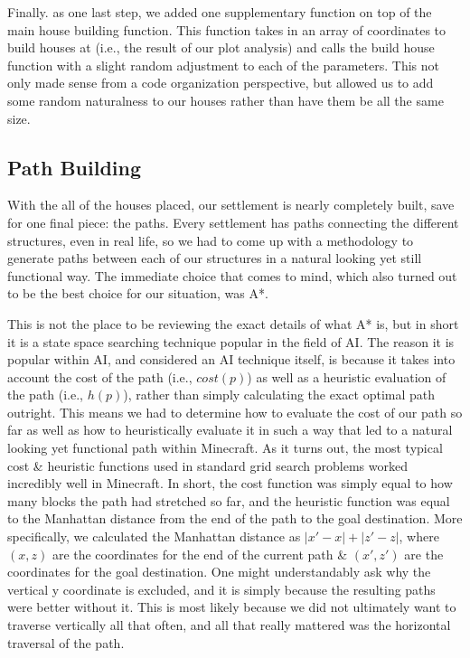 \documentclass[11pt, oneside]{article}
\begin{document}
\begin{normalsize}
Finally. as one last step, we added one supplementary function on top of the main house building function. 
This function takes in an array of coordinates to build houses at (i.e., the result of our plot analysis) and calls the build house function with a slight random adjustment to each of the parameters. 
This not only made sense from a code organization perspective, but allowed us to add some random naturalness to our houses rather than have them be all the same size. 

\subsection{Path Building}

With the all of the houses placed, our settlement is nearly completely built, save for one final piece: the paths. 
Every settlement has paths connecting the different structures, even in real life, so we had to come up with a methodology to generate paths between each of our structures in a natural looking yet still functional way. 
The immediate choice that comes to mind, which also turned out to be the best choice for our situation, was A*.  

This is not the place to be reviewing the exact details of what A* is, but in short it is a state space searching technique popular in the field of AI. 
The reason it is popular within AI, and considered an AI technique itself, is because it takes into account the cost of the path (i.e., $cost(p)$) as well as a heuristic evaluation of the path (i.e., $h(p)$), rather than simply calculating the exact optimal path outright. 
This means we had to determine how to evaluate the cost of our path so far as well as how to heuristically evaluate it in such a way that led to a natural looking yet functional path within Minecraft. 
As it turns out, the most typical cost \& heuristic functions used in standard grid search problems worked incredibly well in Minecraft. 
In short, the cost function was simply equal to how many blocks the path had stretched so far, and the heuristic function was equal to the Manhattan distance from the end of the path to the goal destination.
More specifically, we calculated the Manhattan distance as $|x' - x| + |z' - z|$, where $(x, z)$ are the coordinates for the end of the current path \& $(x', z')$ are the coordinates for the goal destination.
One might understandably ask why the vertical y coordinate is excluded, and it is simply because the resulting paths were better without it. 
This is most likely because we did not ultimately want to traverse vertically all that often, and all that really mattered was the horizontal traversal of the path. 


\end{normalsize}
\end{document}
